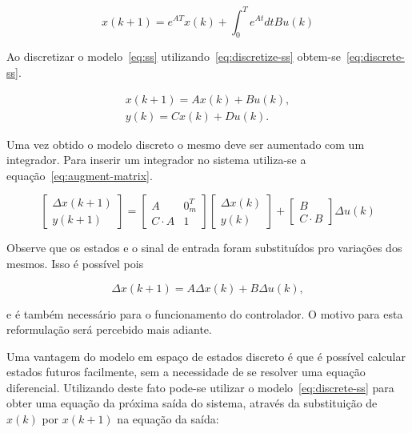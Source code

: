 \begin{equation}
	\label{eq:discretize-ss}
	x(k+1) = e^{AT} x(k) + \int^T_0{e^{At}dt}B u(k)
\end{equation}

Ao discretizar o modelo~\eqref{eq:ss} utilizando~\eqref{eq:discretize-ss}
obtem-se~\eqref{eq:discrete-ss}.

\begin{equation}
	\label{eq:discrete-ss}
	\begin{split}
		x(k+1) = A x(k) + B u(k), \\
		y(k) = C x(k) + Du(k).
	\end{split}
\end{equation}

Uma vez obtido o modelo discreto o mesmo deve ser aumentado com um integrador.
Para inserir um integrador no sistema utiliza-se a
equação~\eqref{eq:augment-matrix}.

\begin{equation}
	\label{eq:augment-matrix}
	\begin{bmatrix}
		\Delta x(k+1) \\
		y(k+1)
	\end{bmatrix} =
	\begin{bmatrix}
		A         & 0_m^T \\
		C\cdot{}A & 1
	\end{bmatrix}
	\begin{bmatrix}
		\Delta x(k) \\
		y(k)
	\end{bmatrix} +
	\begin{bmatrix}
		B \\
		C\cdot{}B
	\end{bmatrix}
	\Delta u(k)
\end{equation}

Observe que os estados e o sinal de entrada foram substituídos pro variações dos
mesmos. Isso é possível pois

\begin{equation}
	\Delta x(k+1) = A \Delta x(k) + B \Delta u(k),
\end{equation}

e é também necessário para o funcionamento do controlador. O motivo para esta
reformulação será percebido mais adiante.

Uma vantagem do modelo em espaço de estados discreto é que é possível calcular
estados futuros facilmente, sem a necessidade de se resolver uma equação
diferencial. Utilizando deste fato pode-se utilizar o
modelo~\eqref{eq:discrete-ss} para obter uma equação da próxima saída do
sistema, através da substituição de \( x(k) \) por \( x(k+1) \) na equação da
saída:

